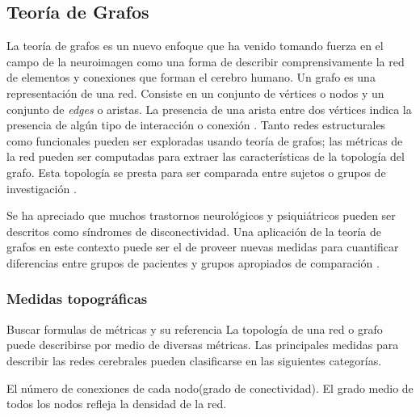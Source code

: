 \subsection{Teoría de Grafos}
La teoría de grafos es un nuevo enfoque que ha venido tomando fuerza en el campo de la neuroimagen como una forma de describir comprensivamente la red de elementos y conexiones que forman el cerebro humano.
Un grafo es una representación de una red. Consiste en un conjunto de vértices o nodos y un conjunto de \textit{edges} o aristas. La presencia de una arista entre dos vértices indica la presencia de algún tipo de interacción o conexión \parencite{Stam2007}.
Tanto redes estructurales como funcionales pueden ser exploradas usando teoría de grafos; las métricas de la red pueden ser computadas para extraer las características de la topología del grafo.
Esta topología se presta para ser comparada entre sujetos o grupos de investigación \parencite{Bullmore2009a,Sporns2011}.\par
Se ha apreciado que muchos trastornos neurológicos y psiquiátricos pueden ser descritos como síndromes de disconectividad.
Una aplicación de la teoría de grafos en este contexto puede ser el de proveer nuevas medidas para cuantificar diferencias entre grupos de pacientes y grupos apropiados de comparación \parencite{Bullmore2009a}.

\subsubsection{Medidas topográficas}
Buscar formulas de métricas y su referencia
La topología de una red o grafo puede describirse por medio de diversas métricas. Las principales medidas para describir las redes cerebrales pueden clasificarse en las siguientes categorías.\par
\theoremstyle{definition}
\newtheorem*{def1}{Costo}
\newtheorem*{def2}{Segregación}
\newtheorem*{def3}{Integración}
\newtheorem*{def4}{Pequeño Mundo}
El número de conexiones de cada nodo(grado de conectividad). El grado medio de todos los nodos refleja la densidad de la red.
